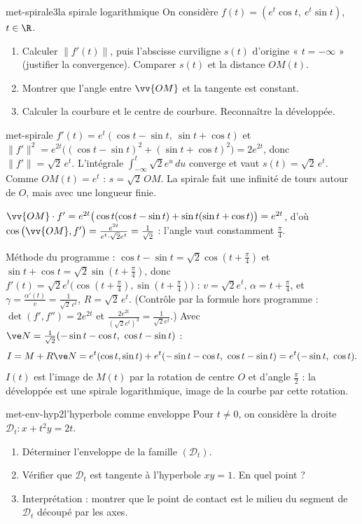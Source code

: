 \begin{exo}{met-spirale}{3}{la spirale logarithmique}
On considère $f(t)=(e^t\cos t,\ e^t\sin t)$, $t\in\R$.
\begin{enumerate}
\item Calculer $\|f'(t)\|$, puis l'abscisse curviligne $s(t)$ d'origine « $t=-\infty$ » (justifier la convergence). Comparer $s(t)$ et la distance $OM(t)$.
\item Montrer que l'angle entre $\vv{OM}$ et la tangente est constant.
\item Calculer la courbure et le centre de courbure. Reconnaître la développée.
\end{enumerate}
\end{exo}

\begin{corrige}{met-spirale}
 $f'(t)=e^t(\cos t-\sin t,\ \sin t+\cos t)$ et $\|f'\|^2=e^{2t}\big((\cos t-\sin t)^2+(\sin t+\cos t)^2\big)=2e^{2t}$, donc $\|f'\|=\sqrt2\,e^t$. L'intégrale $\int_{-\infty}^t\sqrt2e^u\,du$ converge et vaut $s(t)=\sqrt2\,e^t$. Comme $OM(t)=e^t$ : $s=\sqrt2\,OM$. La spirale fait une infinité de tours autour de $O$, mais avec une longueur finie.

 $\vv{OM}\cdot f'=e^{2t}\big(\cos t(\cos t-\sin t)+\sin t(\sin t+\cos t)\big)=e^{2t}$, d'où $\cos\big(\vv{OM},f'\big)=\frac{e^{2t}}{e^t\cdot\sqrt2e^t}=\frac1{\sqrt2}$ : l'angle vaut constamment $\frac\pi4$.

 Méthode du programme : $\cos t-\sin t=\sqrt2\cos(t+\frac\pi4)$ et $\sin t+\cos t=\sqrt2\sin(t+\frac\pi4)$, donc
$f'(t)=\sqrt2e^t\big(\cos(t+\frac\pi4),\sin(t+\frac\pi4)\big)$ : $v=\sqrt2e^t$, $\alpha=t+\frac\pi4$, et $\gamma=\frac{\alpha'(t)}{v}=\frac{1}{\sqrt2\,e^t}$,
$R=\sqrt2\,e^t$. (Contrôle par la formule hors programme : $\det(f',f'')=2e^{2t}$ et $\frac{2e^{2t}}{(\sqrt2e^t)^3}=\frac1{\sqrt2e^t}$.) Avec $\ve N=\frac1{\sqrt2}(-\sin t-\cos t,\ \cos t-\sin t)$ :
\[I=M+R\ve N=e^t(\cos t,\sin t)+e^t(-\sin t-\cos t,\ \cos t-\sin t)=e^t(-\sin t,\ \cos t).\]
$I(t)$ est l'image de $M(t)$ par la rotation de centre $O$ et d'angle $\frac\pi2$ : la développée est une spirale logarithmique, image de la courbe par cette rotation.
\end{corrige}

\begin{exo}{met-env-hyp}{2}{l'hyperbole comme enveloppe}
Pour $t\neq0$, on considère la droite $\mathcal D_t:x+t^2y=2t$.
\begin{enumerate}
\item Déterminer l'enveloppe de la famille $(\mathcal D_t)$.
\item Vérifier que $\mathcal D_t$ est tangente à l'hyperbole $xy=1$. En quel point ?
\item Interprétation : montrer que le point de contact est le milieu du segment de $\mathcal D_t$ découpé par les axes.
\end{enumerate}
\end{exo}

